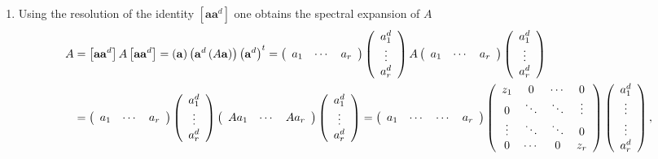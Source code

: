 \documentclass[aps,preprint]{revtex4}%
\begin{document}
\begin{enumerate}
\item Using the resolution of the identity $\left[  \mathbf{aa}^{d}\right]  $
one obtains the spectral expansion of $A$
\begin{align}
A  &  =\left[  \mathbf{aa}^{d}\right]  A\left[  \mathbf{aa}^{d}\right]
=\left(  \mathbf{a}\right)  \left(  \mathbf{a}^{d}\left(  A\mathbf{a}\right)
\right)  \left(  \mathbf{a}^{d}\right)  ^{t}=\left(
\begin{array}
[c]{ccc}%
a_{1} & \cdots & a_{r}%
\end{array}
\right)  \left(
\begin{array}
[c]{c}%
a_{1}^{d}\\
\vdots\\
a_{r}^{d}%
\end{array}
\right)  A\left(
\begin{array}
[c]{ccc}%
a_{1} & \cdots & a_{r}%
\end{array}
\right)  \left(
\begin{array}
[c]{c}%
a_{1}^{d}\\
\vdots\\
a_{r}^{d}%
\end{array}
\right) \\
&  =\left(
\begin{array}
[c]{ccc}%
a_{1} & \cdots & a_{r}%
\end{array}
\right)  \left(
\begin{array}
[c]{c}%
a_{1}^{d}\\
\vdots\\
a_{r}^{d}%
\end{array}
\right)  \left(
\begin{array}
[c]{ccc}%
Aa_{1} & \cdots & Aa_{r}%
\end{array}
\right)  \left(
\begin{array}
[c]{c}%
a_{1}^{d}\\
\vdots\\
a_{r}^{d}%
\end{array}
\right)  =\left(
\begin{array}
[c]{cccc}%
a_{1} & \cdots & \cdots & a_{r}%
\end{array}
\right)  \left(
\begin{array}
[c]{cccc}%
z_{1} & 0 & \cdots & 0\\
0 & \ddots & \ddots & \vdots\\
\vdots & \ddots & \ddots & 0\\
0 & \cdots & 0 & z_{r}%
\end{array}
\right)  \left(
\begin{array}
[c]{c}%
a_{1}^{d}\\
\vdots\\
\vdots\\
a_{r}^{d}%
\end{array}
\right)  ,
\end{align}

\end{enumerate}
\end{document}
